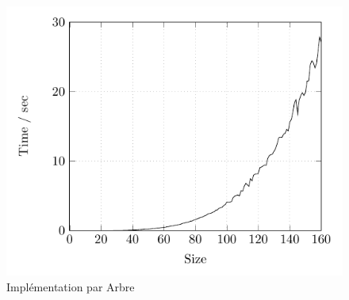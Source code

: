 	\begin{figure}[h]
		\caption{Implémentation par Arbre}
		\includegraphics{Tests/Tree/tree}
	\end{figure}

\subsection{} %



